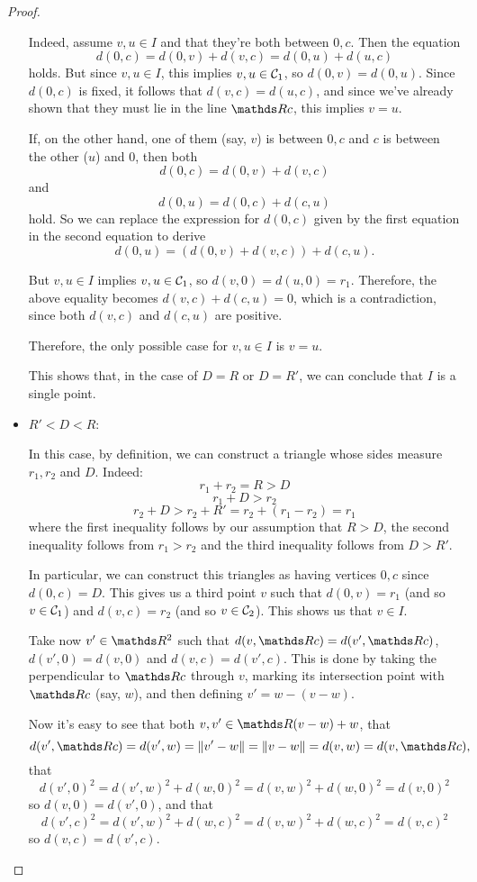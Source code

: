 \begin{proof}
\begin{itemize}
	Indeed, assume $v,u\in I$ and that they're both between $0,c$. Then the equation
	\[d(0,c)=d(0,v)+d(v,c)=d(0,u)+d(u,c)\]holds. But since $v,u\in I$, this implies $v,u\in \mathcal C_1$, so $d(0,v)=d(0,u)$. Since $d(0,c)$ is fixed, it follows that $d(v,c)=d(u,c)$, and since we've already shown that they must lie in the line $\R c$, this implies $v=u$.
	
	If, on the other hand, one of them (say, $v$) is between $0,c$ and $c$ is between the other ($u$) and $0$, then both
	\[d(0,c)=d(0,v)+d(v,c)\]and
	\[d(0,u)=d(0,c)+d(c,u)\]hold. So we can replace the expression for $d(0,c)$ given by the first equation in the second equation to derive
	\[d(0,u)=(d(0,v)+d(v,c))+d(c,u).\]
	
	But $v,u\in I$ implies $v,u\in \mathcal C_1$, so $d(v,0)=d(u,0)=r_1$. Therefore, the above equality becomes $d(v,c)+d(c,u)=0$, which is a contradiction, since both $d(v,c)$ and $d(c,u)$ are positive.
	
	Therefore, the only possible case for $v,u\in I$ is $v=u$.
	
	This shows that, in the case of $D=R$ or $D=R'$, we can conclude that $I$ is a single point.
		
	\item \underline{$R'<D<R$}:
	
	In this case, by definition, we can construct a triangle whose sides measure $r_1,r_2$ and $D$. Indeed:
	\[r_1+r_2=R>D\]
	\[r_1+D>r_2\]
	\[r_2+D>r_2+R'=r_2+(r_1-r_2)=r_1\]where the first inequality follows by our assumption that $R>D$, the second inequality follows from $r_1>r_2$ and the third inequality follows from $D>R'$.
	
	In particular, we can construct this triangles as having vertices $0,c$ since $d(0,c)=D$. This gives us a third point $v$ such that $d(0,v)=r_1$ (and so $v\in \mathcal C_1$) and $d(v,c)=r_2$ (and so $v\in \mathcal C_2$). This shows us that $v\in I$.
	
	Take now $v'\in \R^2$ such that $d(v,\R c)=d(v',\R c)$, $d(v',0)=d(v,0)$ and $d(v,c)=d(v',c)$. This is done by taking the perpendicular to $\R c$ through $v$, marking its intersection point with $\R c$ (say, $w$), and then defining $v'=w-(v-w)$.
	
	Now it's easy to see that both $v,v'\in \R(v-w)+w$, that 
	\[d(v',\R c)=d(v',w)=\norm{v'-w}=\norm{v-w}=d(v,w)=d(v,\R c),\]that
	\[d(v',0)^2=d(v',w)^2+d(w,0)^2=d(v,w)^2+d(w,0)^2=d(v,0)^2\]so $d(v,0)=d(v',0)$, and that
	\[d(v',c)^2=d(v',w)^2+d(w,c)^2=d(v,w)^2+d(w,c)^2=d(v,c)^2\]so $d(v,c)=d(v',c)$.
	

\end{itemize}
\end{proof}
